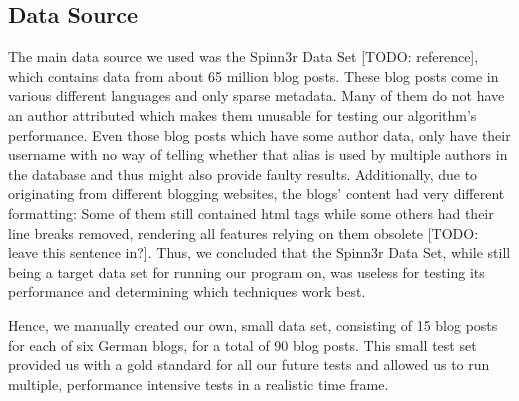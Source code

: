 
\subsection{Data Source}
\label{sec:data_source}

The main data source we used was the Spinn3r Data Set [TODO: reference], which contains data from about 65 million blog posts.
These blog posts come in various different languages and only sparse metadata.
Many of them do not have an author attributed which makes them unusable for testing our algorithm's performance.
Even those blog posts which have some author data, only have their username with no way of telling whether that alias is used by multiple authors in the database and thus might also provide faulty results.
Additionally, due to originating from different blogging websites, the blogs' content had very different formatting: Some of them still contained html tags while some others had their line breaks removed, rendering all features relying on them obsolete [TODO: leave this sentence in?].
Thus, we concluded that the Spinn3r Data Set, while still being a target data set for running our program on, was useless for testing its performance and determining which techniques work best.


Hence, we manually created our own, small data set, consisting of 15 blog posts for each of six German blogs, for a total of 90 blog posts.
This small test set provided us with a gold standard for all our future tests and allowed us to run multiple, performance intensive tests in a realistic time frame.